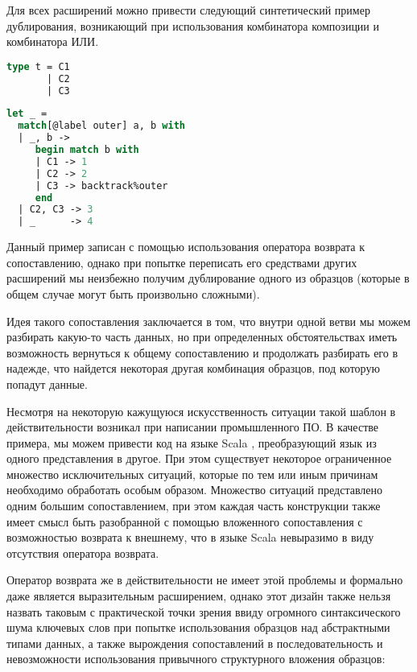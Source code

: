 Для всех расширений можно привести следующий синтетический пример дублирования, возникающий при использования комбинатора композиции и комбинатора ИЛИ.

\noindent
\begin{minipage}{\linewidth}
\begin{lstlisting}[language=ocaml, escapechar=@]
type t = C1
       | C2
       | C3
\end{lstlisting}
\end{minipage}

\noindent
\begin{minipage}{\linewidth}
\begin{lstlisting}[language=ocaml]
let _ =
  match[@label outer] a, b with
  | _, b ->
     begin match b with
     | C1 -> 1
     | C2 -> 2
     | C3 -> backtrack%outer
     end
  | C2, C3 -> 3
  | _      -> 4
\end{lstlisting}
\end{minipage}

Данный пример записан с помощью использования оператора возврата к сопоставлению, однако при попытке переписать его средствами других расширений мы неизбежно получим дублирование одного из образцов (которые в общем случае могут быть произвольно сложными). 

Идея такого сопоставления заключается в том, что внутри одной ветви мы можем разбирать какую-то часть данных, но при определенных обстоятельствах иметь возможность вернуться к общему сопоставлению и продолжать разбирать его в надежде, что найдется некоторая другая комбинация образцов, под которую попадут данные. 

Несмотря на некоторую кажущуюся искусственность ситуации такой шаблон в действительности возникал при написании промышленного ПО. В качестве примера, мы можем привести код на языке Scala \cite{unexpresiveness_example}, преобразующий язык из одного представления в другое. При этом существует некоторое ограниченное множество исключительных ситуаций, которые по тем или иным причинам необходимо обработать особым образом. Множество ситуаций представлено одним большим сопоставлением, при этом каждая часть конструкции также имеет смысл быть разобранной с помощью вложенного сопоставления с возможностью возврата к внешнему, что в языке Scala невыразимо в виду отсутствия оператора возврата.

Оператор возврата же в действительности не имеет этой проблемы и формально даже является выразительным расширением, однако этот дизайн также нельзя назвать таковым с практической точки зрения ввиду огромного синтаксического шума ключевых слов при попытке использования образцов над абстрактными типами данных, а также вырождения сопоставлений в последовательность и невозможности использования привычного структурного вложения образцов:

